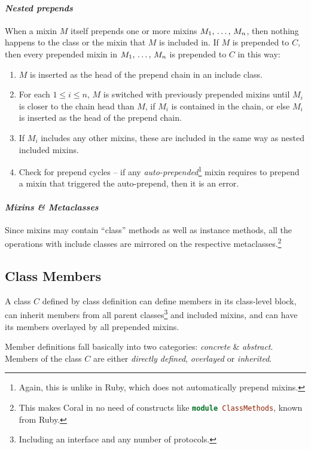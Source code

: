 \paragraph{\em Nested prepends}
When a mixin $M$ itself prepends one or more mixins $M_1 ,\, \ldots ,\, M_n$, then nothing happens to the class or the mixin that $M$ is included in. If $M$ is prepended to $C$, then every prepended mixin in $M_1 ,\, \ldots ,\, M_n$ is prepended to $C$ in this way:
\begin{enumerate}
\item $M$ is inserted as the head of the prepend chain in an include class. 
\item For each $1 \le i \le n$, $M$ is switched with previously prepended mixins until $M_i$ is closer to the chain head than $M$, if $M_i$ is contained in the chain, or else $M_i$ is inserted as the head of the prepend chain. 
\item If $M_i$ includes any other mixins, these are included in the same way as nested included mixins. 
\item Check for prepend cycles -- if any {\em auto-prepended}\footnote{Again, this is unlike in Ruby, which does not automatically prepend mixins.} mixin requires to prepend a mixin that triggered the auto-prepend, then it is an error. 
\end{enumerate}

\paragraph{\em Mixins \& Metaclasses}
Since mixins may contain ``class'' methods as well as instance methods, all the operations with include classes are mirrored on the respective metaclasses.\footnote{This makes Coral in no need of constructs like \lstinline[language=Ruby]!module ClassMethods!, known from Ruby.}

\subsection{Class Members}
\label{sec:class-members}

A class $C$ defined by class definition can define members in its class-level block, can inherit members from all parent classes\footnote{Including an interface and any number of protocols.} and included mixins, and can have its members overlayed by all prepended mixins. 

Member definitions fall basically into two categories: {\em concrete} \& {\em abstract}. Members of the class $C$ are either {\em directly defined}, {\em overlayed} or {\em inherited}. 

